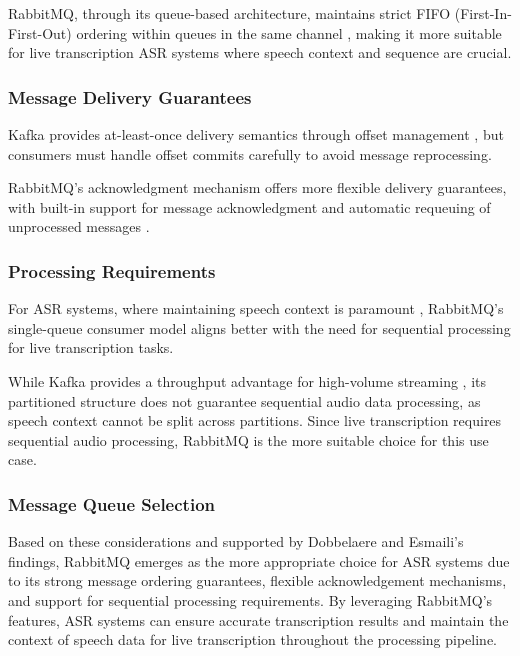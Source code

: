RabbitMQ, through its queue-based architecture, maintains strict FIFO (First-In-First-Out) ordering within queues in the same channel \cite{kafka_v_rabbitmq}, making it more suitable for live transcription ASR systems where speech context and sequence are crucial.

\subsubsection{Message Delivery Guarantees}
Kafka provides at-least-once delivery semantics through offset management \cite{kafka_v_rabbitmq}, but consumers must handle offset commits carefully to avoid message reprocessing.

RabbitMQ's acknowledgment mechanism offers more flexible delivery guarantees, with built-in support for message acknowledgment \cite{kafka_v_rabbitmq} and automatic requeuing of unprocessed messages \cite{rabbitmq_nack}.

\subsubsection{Processing Requirements}
For ASR systems, where maintaining speech context is paramount \cite{speech_context}, RabbitMQ's single-queue consumer model aligns better with the need for sequential processing for live transcription tasks.

While Kafka provides a throughput advantage for high-volume streaming \cite{kafka_v_rabbitmq}, its partitioned structure does not guarantee sequential audio data processing, as speech context cannot be split across partitions. Since live transcription requires sequential audio processing, RabbitMQ is the more suitable choice for this use case.

\subsubsection{Message Queue Selection} \label{subsection:research_gap}
Based on these considerations and supported by Dobbelaere and Esmaili's \cite{kafka_v_rabbitmq} findings, RabbitMQ emerges as the more appropriate choice for ASR systems due to its strong message ordering guarantees, flexible acknowledgement mechanisms, and support for sequential processing requirements. By leveraging RabbitMQ's features, ASR systems can ensure accurate transcription results and maintain the context of speech data for live transcription throughout the processing pipeline.


